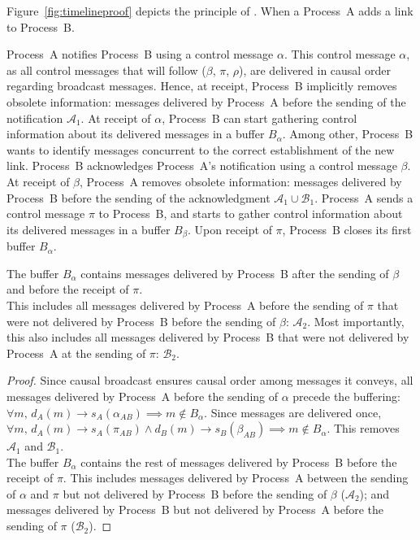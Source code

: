 Figure~\ref{fig:timelineproof} depicts the principle of \RPCBROADCAST. When a
Process~A adds a link to Process~B. %

Process~A notifies Process~B using a control message $\alpha$. This control
message $\alpha$, as all control messages that will follow ($\beta$, $\pi$,
$\rho$), are delivered in causal order regarding broadcast messages. Hence, at
receipt, Process~B implicitly removes obsolete information: messages delivered
by Process~A before the sending of the notification $\mathcal{A}_1$. At receipt
of $\alpha$, Process~B can start gathering control information about its
delivered messages in a buffer $B_\alpha$. Among other, Process~B wants to
identify messages concurrent to the correct establishment of the new
link. Process~B acknowledges Process~A's notification using a control message
$\beta$. At receipt of $\beta$, Process~A removes obsolete information: messages
delivered by Process~B before the sending of the acknowledgment
$\mathcal{A}_1 \cup \mathcal{B}_1$. Process~A sends a control message $\pi$ to
Process~B, and starts to gather control information about its delivered messages
in a buffer $B_\beta$. Upon receipt of $\pi$, Process~B closes its first buffer
$B_\alpha$.
  
\begin{lemma}
  The buffer $B_\alpha$ contains messages delivered by Process~B after the
  sending of $\beta$ and before the receipt of $\pi$.\\
  This includes all messages delivered by Process~A before the sending of $\pi$
  that were not delivered by Process~B before the sending of $\beta$:
  $\mathcal{A}_2$. Most importantly, this also includes all messages delivered
  by Process~B that were not delivered by Process~A at the sending of $\pi$:
  $\mathcal{B}_2$.
\end{lemma}

\begin{proof}
  Since causal broadcast ensures causal order among messages it conveys, all
  messages delivered by Process~A before the sending of $\alpha$ precede the
  buffering:
  $\forall m,\, d_A(m) \rightarrow s_A(\alpha_{AB}) \implies m \not \in
  B_\alpha$.
  Since messages are delivered once,
  $\forall m,\, d_A(m) \rightarrow s_A(\pi_{AB}) \wedge d_B(m) \rightarrow
  s_B(\beta_{AB}) \implies m \not \in B_\alpha$.
  This removes $\mathcal{A}_1$ and $\mathcal{B}_1$.\\
  The buffer $B_\alpha$ contains the rest of messages delivered by Process~B
  before the receipt of $\pi$. This includes messages delivered by Process~A
  between the sending of $\alpha$ and $\pi$ but not delivered by Process~B
  before the sending of $\beta$ ($\mathcal{A}_2$); and messages delivered by
  Process~B but not delivered by Process~A before the sending of $\pi$
  ($\mathcal{B}_2$).
\end{proof}

